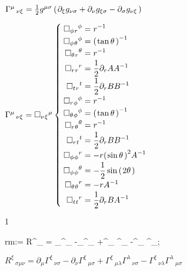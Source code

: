 \documentclass[10pt]{article}
\newcommand\brwrap[3]{%
  \setbox0=\hbox{$#2$}
  \left#1\vbox to \the\ht0{\hbox to 0pt{}}\right.\kern-.2em
  \begingroup #2\endgroup\kern-.15em
  \left.\vbox to \the\ht0{\hbox to 0pt{}}\right#3
}
\begin{document}
\begin{adjustwidth}{1em}{0cm}${}\Gamma^{\mu}\,_{\nu \xi} = \frac{1}{2}g^{\mu \sigma} \brwrap{(}{\partial_{\xi}{g_{\nu \sigma}}+\partial_{\nu}{g_{\xi \sigma}}-\partial_{\sigma}{g_{\nu \xi}}}{)}$\end{adjustwidth}
\begin{adjustwidth}{1em}{0cm}${}\Gamma^{\mu}\,_{\nu \xi} = \square{}_{\nu}{}_{\xi}{}^{\mu}\brwrap{\{}{\begin{aligned}\square{}_{\phi}{}_{r}{}^{\phi}& = {r}^{-1}\\[-.5ex]
\square{}_{\phi}{}_{\theta}{}^{\phi}& = {\brwrap{(}{\tan{\theta}}{)}}^{-1}\\[-.5ex]
\square{}_{\theta}{}_{r}{}^{\theta}& = {r}^{-1}\\[-.5ex]
\square{}_{r}{}_{r}{}^{r}& = \frac{1}{2}\partial_{r}{A} {A}^{-1}\\[-.5ex]
\square{}_{t}{}_{r}{}^{t}& = \frac{1}{2}\partial_{r}{B} {B}^{-1}\\[-.5ex]
\square{}_{r}{}_{\phi}{}^{\phi}& = {r}^{-1}\\[-.5ex]
\square{}_{\theta}{}_{\phi}{}^{\phi}& = {\brwrap{(}{\tan{\theta}}{)}}^{-1}\\[-.5ex]
\square{}_{r}{}_{\theta}{}^{\theta}& = {r}^{-1}\\[-.5ex]
\square{}_{r}{}_{t}{}^{t}& = \frac{1}{2}\partial_{r}{B} {B}^{-1}\\[-.5ex]
\square{}_{\phi}{}_{\phi}{}^{r}& = -r {\brwrap{(}{\sin{\theta}}{)}}^{2} {A}^{-1}\\[-.5ex]
\square{}_{\phi}{}_{\phi}{}^{\theta}& =  - \frac{1}{2}\sin\brwrap{(}{2\theta}{)}\\[-.5ex]
\square{}_{\theta}{}_{\theta}{}^{r}& = -r {A}^{-1}\\[-.5ex]
\square{}_{t}{}_{t}{}^{r}& = \frac{1}{2}\partial_{r}{B} {A}^{-1}\\[-.5ex]
\end{aligned}}{.}
$\end{adjustwidth}
1
\begin{python}
rm:= R^{\xi}_{\sigma\mu\nu} = \partial_{\mu}{\Gamma^{\xi}_{\nu\sigma}}
                                  -\partial_{\nu}{\Gamma^{\xi}_{\mu\sigma}}
                                  +\Gamma^{\xi}_{\mu\lambda} \Gamma^{\lambda}_{\nu\sigma}
                                  -\Gamma^{\xi}_{\nu\lambda} \Gamma^{\lambda}_{\mu\sigma};
\end{python}
\begin{adjustwidth}{1em}{0cm}${}R^{\xi}\,_{\sigma \mu \nu} = \partial_{\mu}{\Gamma^{\xi}\,_{\nu \sigma}}-\partial_{\nu}{\Gamma^{\xi}\,_{\mu \sigma}}+\Gamma^{\xi}\,_{\mu \lambda} \Gamma^{\lambda}\,_{\nu \sigma}-\Gamma^{\xi}\,_{\nu \lambda} \Gamma^{\lambda}\,_{\mu \sigma}$\end{adjustwidth}
\end{document}
